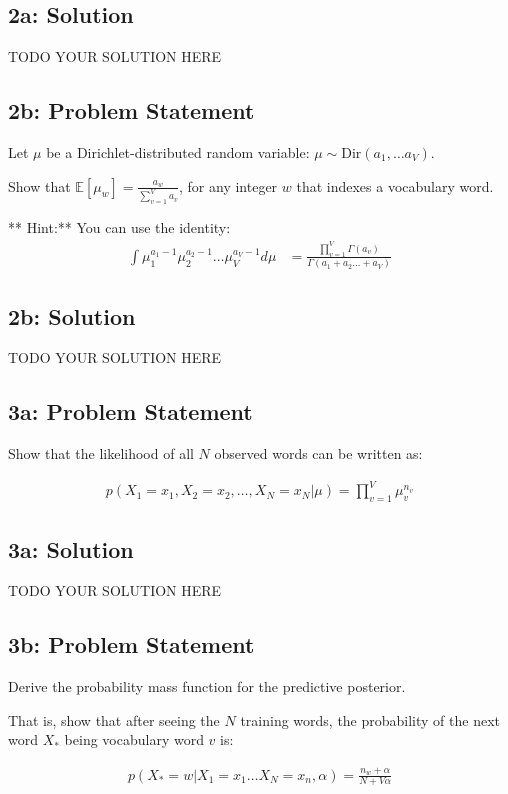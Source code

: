 \documentclass[12pt]{article}
\newcommand{\officialdirections}[1]{{\color{blue} #1}}
\begin{document}
\subsection{2a: Solution}
TODO YOUR SOLUTION HERE

\newpage
\officialdirections{
\subsection*{2b: Problem Statement}

Let $\mu$ be a Dirichlet-distributed random variable: $\mu \sim \text{Dir}(a_1, \ldots a_V)$. 

Show that $\mathbb{E}[ \mu_w ] = \frac{a_w}{\sum_{v=1}^V a_v}$, for any integer $w$ that indexes a vocabulary word.

** Hint:** You can use the identity:
\begin{align}
\int \mu_1^{a_1-1} \mu_2^{a_2 - 1} \ldots \mu_V^{a_V-1} d\mu
 &= \frac
 	{\prod_{v=1}^V \Gamma(a_v)}
 	{\Gamma(a_1 + a_2 \ldots + a_V)}
\end{align}
}

\subsection{2b: Solution}
TODO YOUR SOLUTION HERE

\newpage
\officialdirections{
\subsection*{3a: Problem Statement}

Show that the likelihood of all $N$ observed words can be written as:

\begin{align}
p(X_1 = x_1, X_2 = x_2, \ldots, X_N = x_N | \mu) = \prod_{v=1}^V \mu_v^{n_v}
\end{align}
}

\subsection{3a: Solution}


TODO YOUR SOLUTION HERE


\newpage
\officialdirections{
\subsection*{3b: Problem Statement}

Derive the probability mass function for the predictive posterior.

That is, show that after seeing the $N$ training words, the probability of the next word $X_*$ being vocabulary word $v$ is:

\begin{align}
p( X_* = w | X_1 = x_1 \ldots X_N = x_n, \alpha) = \frac{n_w + \alpha}{N + V\alpha}
\end{align}
}
\end{document}
